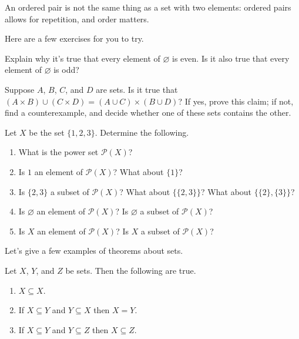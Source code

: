 \documentclass[../main.tex]{subfiles}
\begin{document}
\begin{remark}
    An ordered pair is not the same thing as a set with two elements: ordered pairs allows for repetition, and order matters.
\end{remark}
Here are a few exercises for you to try.
\begin{exercise}
    Explain why it's true that every element of $\varnothing$ is even. Is it also true that every element of $\varnothing$ is odd? 
\end{exercise}
\begin{exercise}
    Suppose $A$, $B$, $C$, and $D$ are sets. Is it true that $(A \times B) \cup (C \times D) = (A \cup C) \times (B \cup D)$? If yes, prove this claim; if not, find a counterexample, and decide whether one of these sets contains the other.
\end{exercise}
\begin{exercise}
    Let $X$ be the set $\{1, 2, 3\}$. Determine the following.
    \begin{enumerate}[label=(\alph*)]
        \item What is the power set $\mathcal{P}(X)$?
        \item Is $1$ an element of $\mathcal{P}(X)$? What about $\{1\}$?
        \item Is $\{2, 3\}$ a subset of $\mathcal{P}(X)$? What about $\{\{2, 3\}\}$? What about $\{\{2\}, \{3\}\}$?
        \item Is $\varnothing$ an element of $\mathcal{P}(X)$? Is $\varnothing$ a subset of $\mathcal{P}(X)$?
        \item Is $X$ an element of $\mathcal{P}(X)$? Is $X$ a subset of $\mathcal{P}(X)$?
    \end{enumerate}
\end{exercise}
Let's give a few examples of theorems about sets.
\begin{theorem} \label{thm:px-is-poset}
    Let $X$, $Y$, and $Z$ be sets. Then the following are true.
    \begin{enumerate}[label=(\alph*)]
        \item $X \subseteq X$.
        \item If $X \subseteq Y$ and $Y \subseteq X$ then $X = Y$.
        \item If $X \subseteq Y$ and $Y \subseteq Z$ then $X \subseteq Z$.
    \end{enumerate}
\end{theorem}
\end{document}
